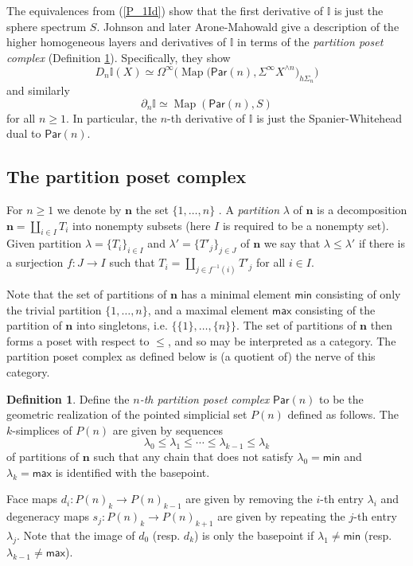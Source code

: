 \documentclass[12pt]{amsart}
\theoremstyle{definition}
\newtheorem{definition}[subsection]{Definition}
\theoremstyle{remark}
\newcommand{\Sp}{\Sigma^{\infty}}
\newcommand{\U}{\Omega^{\infty}}
\newcommand{\Map}{\operatorname{Map}}
\newcommand{\Id}{\mathbb{I}}
\newcommand{\Par}{\mathsf{Par}}
\begin{document}
The equivalences from (\ref{P_1Id}) show that the first derivative of $\Id$ is just the sphere spectrum $S$. Johnson \cite{Joh} and later Arone-Mahowald \cite{Ar-Mah} give a description of the higher homogeneous layers and derivatives of $\Id$ in terms of the\textit{ partition poset complex} (Definition \ref{def:par-poset}). Specifically, they show 
\begin{equation} \label{D_n I}
    D_n \Id (X)\simeq \U\Big( \Map \big(\mathsf{Par}(n), \Sp X^{\wedge n}\big)_{h \Sigma_n}\Big)
\end{equation}
and similarly \begin{equation} \label{der_n I}\partial_n \Id\simeq \Map( \mathsf{Par}(n), S)\end{equation}
for all $n\geq 1$. In particular, the $n$-th derivative of $\Id$ is just the Spanier-Whitehead dual to $\Par(n)$.



\subsection{The partition poset complex}
For $n\geq 1$ we denote by $\mathbf{n}$ the set $\{1,\dots,n\}$%
. A \textit{partition} $\lambda$ of $\mathbf{n}$ is a decomposition $\mathbf{n}=\coprod_{i\in I} T_i$ into nonempty subsets (here $I$ is required to be a nonempty set). Given partition $\lambda=\{T_i\}_{i\in I}$ and $\lambda'=\{T'_j\}_{j\in J}$ of $\mathbf{n}$ we say that $\lambda \leq \lambda'$ if there is a surjection $f\colon J\to I$ such that $T_i=\coprod_{j\in f^{-1}(i)} T'_j$ for all $i\in I$. 

Note that the set of partitions of $\mathbf{n}$ has a minimal element $\mathsf{min}$ consisting of only the trivial partition $\{1,\dots,n\}$, and a maximal element $\mathsf{max}$ consisting of the partition of $\mathbf{n}$ into singletons, i.e. $\{\{1\},\dots, \{n\}\}$. The set of partitions of $\mathbf{n}$ then forms a poset with respect to $\leq$, and so may be interpreted as a category. The partition poset complex as defined below is (a quotient of) the nerve of this category.

\begin{definition} \label{def:par-poset} Define the \textit{$n$-th partition poset complex} $\Par(n)$ to be the geometric realization of the pointed simplicial set $P(n)$ defined as follows. The $k$-simplices of $P(n)$ are given by sequences \[ \lambda_0 \leq \lambda_1 \leq \cdots \leq \lambda_{k-1} \leq \lambda_k \] of partitions of $\mathbf{n}$ such that any chain that does not satisfy $\lambda_0=\mathsf{min}$ and $\lambda_k=\mathsf{max}$ is identified with the basepoint. 

Face maps $d_i\colon P(n)_k\to P(n)_{k-1}$ are given by removing the $i$-th entry $\lambda_i$ and degeneracy maps $s_j\colon P(n)_k\to P(n)_{k+1}$ are given by repeating the $j$-th entry $\lambda_j$. Note that the image of $d_0$ (resp. $d_k$) is only the basepoint if $\lambda_1\neq \mathsf{min}$ (resp. $\lambda_{k-1}\neq \mathsf{max}$).
\end{definition}
\end{document}
